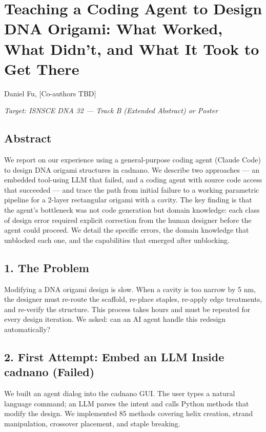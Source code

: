 \documentclass[
  11pt,
]{article}
\author{}
\date{}
\begin{document}
\section{Teaching a Coding Agent to Design DNA Origami: What Worked,
What Didn't, and What It Took to Get
There}\label{teaching-a-coding-agent-to-design-dna-origami-what-worked-what-didnt-and-what-it-took-to-get-there}

Daniel Fu, {[}Co-authors TBD{]}

\emph{Target: ISNSCE DNA 32 --- Track B (Extended Abstract) or Poster}

\subsection{Abstract}\label{abstract}

We report on our experience using a general-purpose coding agent (Claude
Code) to design DNA origami structures in cadnano. We describe two
approaches --- an embedded tool-using LLM that failed, and a coding
agent with source code access that succeeded --- and trace the path from
initial failure to a working parametric pipeline for a 2-layer
rectangular origami with a cavity. The key finding is that the agent's
bottleneck was not code generation but domain knowledge: each class of
design error required explicit correction from the human designer before
the agent could proceed. We detail the specific errors, the domain
knowledge that unblocked each one, and the capabilities that emerged
after unblocking.

\subsection{1. The Problem}\label{the-problem}

Modifying a DNA origami design is slow. When a cavity is too narrow by 5
nm, the designer must re-route the scaffold, re-place staples, re-apply
edge treatments, and re-verify the structure. This process takes hours
and must be repeated for every design iteration. We asked: can an AI
agent handle this redesign automatically?

\subsection{2. First Attempt: Embed an LLM Inside cadnano
(Failed)}\label{first-attempt-embed-an-llm-inside-cadnano-failed}

We built an agent dialog into the cadnano GUI. The user types a natural
language command; an LLM parses the intent and calls Python methods that
modify the design. We implemented 85 methods covering helix creation,
strand manipulation, crossover placement, and staple breaking.
\end{document}
